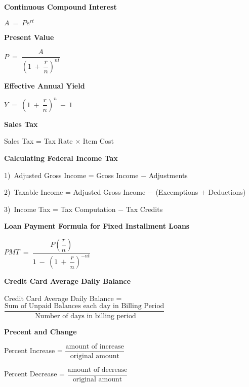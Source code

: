 \documentclass{article}
\begin{document}
\begin{large}
\textbf{Continuous Compound Interest}

\hspace{2.5in} $A\ =\ Pe^{rt}$

\textbf{Present Value}

\hspace{2.5in} $P\ =\ \dfrac{A}{\left(1\ +\ \dfrac{r}{n}\right)^{nt}}$

\textbf{Effective Annual Yield}

\hspace{2.5in} $Y\ =\ \left(1\ +\ \dfrac{r}{n}\right)^{n}\ -\ 1$

\textbf{Sales Tax}

\hspace{2.0in} Sales Tax = Tax Rate $\times$ Item Cost

\vspace{0.5in}
\textbf{Calculating Federal Income Tax}

\hspace{0.1in} 1)\ Adjusted Gross Income = Gross Income $-$ Adjustments

\hspace{0.1in} 2)\ Taxable Income = Adjusted Gross Income $-$ (Excemptions $+$ Deductions)

\hspace{0.1in} 3)\ Income Tax = Tax Computation $-$ Tax Credits

\textbf{Loan Payment Formula for Fixed Installment Loans}

\hspace{1.5in} $PMT\ =\ \dfrac{P\left(\dfrac{r}{n}\right)}{1\ -\ \left(1\ +\ \dfrac{r}{n}\right)^{-nt}}$\hspace{0.2in} 

\textbf{Credit Card Average Daily Balance}

\hspace{0.1in} Credit Card Average Daily Balance = $\dfrac{\text{Sum of Unpaid Balances each day in Billing Period}}{\text{ Number of days in billing period}}$

\textbf{Precent and Change}

\hspace{0.1in} Percent Increase = $\dfrac{\text{amount of increase}}{\text{original amount}}$

\hspace{0.1in} Percent Decrease = $\dfrac{\text{amount of decrease}}{\text{original amount}}$

\vspace{0.25in}


\end{large}
\end{document}
